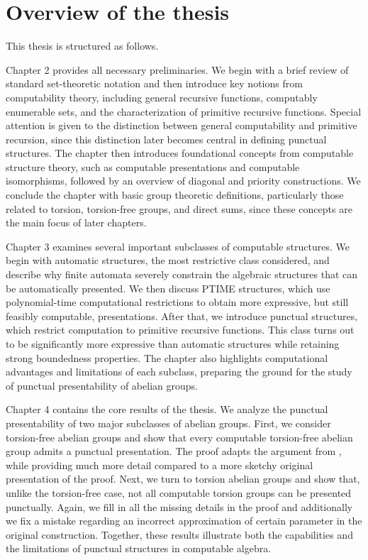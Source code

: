 \documentclass{pracalicmgr2025}
\theoremstyle{plain}            %
\theoremstyle{remark}           %
\theoremstyle{definition}       %
\begin{document}
\section{Overview of the thesis}
This thesis is structured as follows.

Chapter 2 provides all necessary preliminaries. We begin with a brief review of standard set-theoretic notation and then introduce key notions from computability theory, including general recursive functions, computably enumerable sets, and the characterization of primitive recursive functions. Special attention is given to the distinction between general computability and primitive recursion, since this distinction later becomes central in defining punctual structures. The chapter then introduces foundational concepts from computable structure theory, such as computable presentations and computable isomorphisms, followed by an overview of diagonal and priority constructions. We conclude the chapter with basic group theoretic definitions, particularly those related to torsion, torsion-free groups, and direct sums, since these concepts are the main focus of later chapters.

Chapter 3 examines several important subclasses of computable structures. We begin with automatic structures, the most restrictive class considered, and describe why finite automata severely constrain the algebraic structures that can be automatically presented. We then discuss PTIME structures, which use polynomial-time computational restrictions to obtain more expressive, but still feasibly computable, presentations. After that, we introduce punctual structures, which restrict computation to primitive recursive functions. This class turns out to be significantly more expressive than automatic structures while retaining strong boundedness properties. The chapter also highlights computational advantages and limitations of each subclass, preparing the ground for the study of punctual presentability of abelian groups.

Chapter 4 contains the core results of the thesis. We analyze the punctual presentability of two major subclasses of abelian groups. First, we consider torsion-free abelian groups and show that every computable torsion-free abelian group admits a punctual presentation. The proof adapts the argument from \cite{3}, while providing much more detail compared to a more sketchy original presentation of the proof. Next, we turn to torsion abelian groups and show that, unlike the torsion-free case, not all computable torsion groups can be presented punctually. Again, we fill in all the missing details in the proof and additionally we fix a mistake regarding an incorrect approximation of certain parameter in the original construction. Together, these results illustrate both the capabilities and the limitations of punctual structures in computable algebra.
\end{document}
